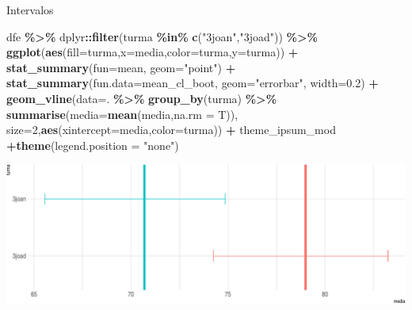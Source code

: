 \documentclass[
  9pt,
  ignorenonframetext,
  aspectratio=169]{beamer}
\newenvironment{Shaded}{\begin{snugshade}}{\end{snugshade}}
\newcommand{\DataTypeTok}[1]{\textcolor[rgb]{0.13,0.29,0.53}{#1}}
\newcommand{\DecValTok}[1]{\textcolor[rgb]{0.00,0.00,0.81}{#1}}
\newcommand{\FloatTok}[1]{\textcolor[rgb]{0.00,0.00,0.81}{#1}}
\newcommand{\KeywordTok}[1]{\textcolor[rgb]{0.13,0.29,0.53}{\textbf{#1}}}
\newcommand{\NormalTok}[1]{#1}
\newcommand{\OperatorTok}[1]{\textcolor[rgb]{0.81,0.36,0.00}{\textbf{#1}}}
\newcommand{\StringTok}[1]{\textcolor[rgb]{0.31,0.60,0.02}{#1}}
\begin{document}
\begin{frame}[fragile]{Intervalos}
\protect\hypertarget{intervalos}{}
\begin{Shaded}
\begin{Highlighting}[]
\NormalTok{dfe }\OperatorTok{\%\textgreater{}\%}\StringTok{ }\NormalTok{dplyr}\OperatorTok{::}\KeywordTok{filter}\NormalTok{(turma }\OperatorTok{\%in\%}\StringTok{ }\KeywordTok{c}\NormalTok{(}\StringTok{"3joan"}\NormalTok{,}\StringTok{"3joad"}\NormalTok{)) }\OperatorTok{\%\textgreater{}\%}\StringTok{ }
\StringTok{  }\KeywordTok{ggplot}\NormalTok{(}\KeywordTok{aes}\NormalTok{(}\DataTypeTok{fill=}\NormalTok{turma,}\DataTypeTok{x=}\NormalTok{media,}\DataTypeTok{color=}\NormalTok{turma,}\DataTypeTok{y=}\NormalTok{turma)) }\OperatorTok{+}
\StringTok{  }\KeywordTok{stat\_summary}\NormalTok{(}\DataTypeTok{fun=}\NormalTok{mean, }\DataTypeTok{geom=}\StringTok{"point"}\NormalTok{) }\OperatorTok{+}\StringTok{ }
\StringTok{  }\KeywordTok{stat\_summary}\NormalTok{(}\DataTypeTok{fun.data=}\NormalTok{mean\_cl\_boot, }\DataTypeTok{geom=}\StringTok{"errorbar"}\NormalTok{, }\DataTypeTok{width=}\FloatTok{0.2}\NormalTok{) }\OperatorTok{+}
\StringTok{  }\KeywordTok{geom\_vline}\NormalTok{(}\DataTypeTok{data=}\NormalTok{. }\OperatorTok{\%\textgreater{}\%}\StringTok{ }\KeywordTok{group\_by}\NormalTok{(turma) }\OperatorTok{\%\textgreater{}\%}\StringTok{ }\KeywordTok{summarise}\NormalTok{(}\DataTypeTok{media=}\KeywordTok{mean}\NormalTok{(media,}\DataTypeTok{na.rm =}\NormalTok{ T)),}
             \DataTypeTok{size=}\DecValTok{2}\NormalTok{,}\KeywordTok{aes}\NormalTok{(}\DataTypeTok{xintercept=}\NormalTok{media,}\DataTypeTok{color=}\NormalTok{turma)) }\OperatorTok{+}\StringTok{ }
\StringTok{  }\NormalTok{theme\_ipsum\_mod }\OperatorTok{+}\KeywordTok{theme}\NormalTok{(}\DataTypeTok{legend.position =} \StringTok{"none"}\NormalTok{)}
\end{Highlighting}
\end{Shaded}

\includegraphics{aula_11_files/figure-beamer/unnamed-chunk-4-1.pdf}
\end{frame}
\end{document}
